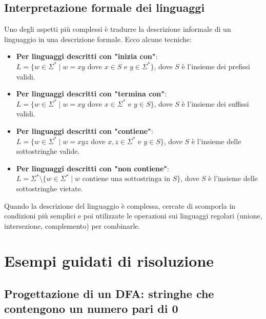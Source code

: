 \documentclass[12pt,a4paper]{article}
\begin{document}
\subsection{Interpretazione formale dei linguaggi}

Uno degli aspetti più complessi è tradurre la descrizione informale di un linguaggio in una descrizione formale. Ecco alcune tecniche:

\begin{itemize}
  \item \textbf{Per linguaggi descritti con "inizia con"}: $L = \{w \in \Sigma^* \mid w = xy \text{ dove } x \in S \text{ e } y \in \Sigma^*\}$, dove $S$ è l'insieme dei prefissi validi.
  
  \item \textbf{Per linguaggi descritti con "termina con"}: $L = \{w \in \Sigma^* \mid w = xy \text{ dove } x \in \Sigma^* \text{ e } y \in S\}$, dove $S$ è l'insieme dei suffissi validi.
  
  \item \textbf{Per linguaggi descritti con "contiene"}: $L = \{w \in \Sigma^* \mid w = xyz \text{ dove } x,z \in \Sigma^* \text{ e } y \in S\}$, dove $S$ è l'insieme delle sottostringhe valide.
  
  \item \textbf{Per linguaggi descritti con "non contiene"}: $L = \Sigma^* \setminus \{w \in \Sigma^* \mid w \text{ contiene una sottostringa in } S\}$, dove $S$ è l'insieme delle sottostringhe vietate.
\end{itemize}

\begin{suggerimento}
Quando la descrizione del linguaggio è complessa, cercate di scomporla in condizioni più semplici e poi utilizzate le operazioni sui linguaggi regolari (unione, intersezione, complemento) per combinarle.
\end{suggerimento}

\section{Esempi guidati di risoluzione}

\subsection{Progettazione di un DFA: stringhe che contengono un numero pari di 0}
\end{document}
